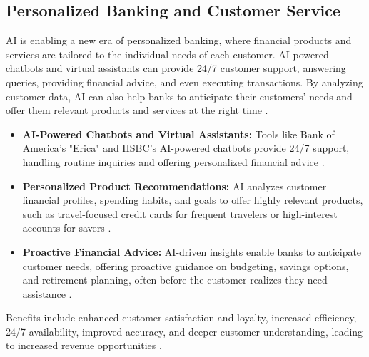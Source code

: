 \subsection{Personalized Banking and Customer Service}
AI is enabling a new era of personalized banking, where financial products and services are tailored to the individual needs of each customer. AI-powered chatbots and virtual assistants can provide 24/7 customer support, answering queries, providing financial advice, and even executing transactions. By analyzing customer data, AI can also help banks to anticipate their customers' needs and offer them relevant products and services at the right time \cite{fma2024understanding}.
\begin{itemize}
    \item \textbf{AI-Powered Chatbots and Virtual Assistants:} Tools like Bank of America's "Erica" and HSBC's AI-powered chatbots provide 24/7 support, handling routine inquiries and offering personalized financial advice \cite{Straive_PersonalizedBanking, Kayako_PersonalizedBanking}.
    \item \textbf{Personalized Product Recommendations:} AI analyzes customer financial profiles, spending habits, and goals to offer highly relevant products, such as travel-focused credit cards for frequent travelers or high-interest accounts for savers \cite{SpeednetSoftware_PersonalizedBanking, Fastbots_PersonalizedBanking}.
    \item \textbf{Proactive Financial Advice:} AI-driven insights enable banks to anticipate customer needs, offering proactive guidance on budgeting, savings options, and retirement planning, often before the customer realizes they need assistance \cite{Nice_PersonalizedBanking}.
\end{itemize}
Benefits include enhanced customer satisfaction and loyalty, increased efficiency, 24/7 availability, improved accuracy, and deeper customer understanding, leading to increased revenue opportunities \cite{Hexaware_PersonalizedBanking, Fiorano_PersonalizedBanking}.


